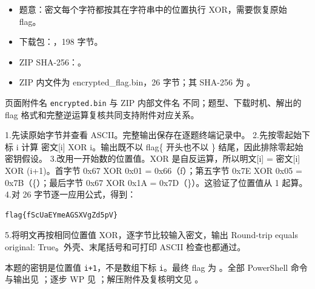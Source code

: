 \begin{itemize}
\tightlist
\item
  题意：密文每个字符都按其在字符串中的位置执行 XOR，需要恢复原始 flag。
\item
  下载包：\texttt{}，198 字节。
\item
  ZIP SHA-256：。
\item
  ZIP 内文件为 encrypted\_flag.bin，26 字节；其 SHA-256 为 。
\end{itemize}

页面附件名 \texttt{encrypted.bin} 与 ZIP 内部文件名 \texttt{} 不同；题型、下载时机、解出的 flag 格式和完整逆运算复核共同支持附件对应关系。

1.先读原始字节并查看 ASCII。完整输出保存在逐题终端记录中。 2.先按零起始下标 i 计算 密文{[}i{]} XOR i。输出既不以 flag\{ 开头也不以 \} 结尾，因此排除零起始密钥假设。 3.改用一开始数的位置值。XOR 是自反运算，所以明文{[}i{]} = 密文{[}i{]} XOR (i+1)。首字节 0x67 XOR 0x01 = 0x66（f）；第五字节 0x7E XOR 0x05 = 0x7B（\{）；最后字节 0x67 XOR 0x1A = 0x7D（\}）。这验证了位置值从 1 起算。 4.对 26 字节逐一应用公式，得到：

\begin{verbatim}
flag{fScUaEYmeAGSXVgZd5pV}
\end{verbatim}

5.将明文再按相同位置值 XOR，逐字节比较输入密文，输出 Round-trip equals original: True。外壳、末尾括号和可打印 ASCII 检查也都通过。

本题的密钥是位置值 \texttt{i+1}，不是数组下标 \texttt{i}。最终 flag 为 \texttt{}。全部 PowerShell 命令与输出见 \texttt{}；逐步 WP 见 \texttt{}；解压附件及复核明文见 \texttt{}。


